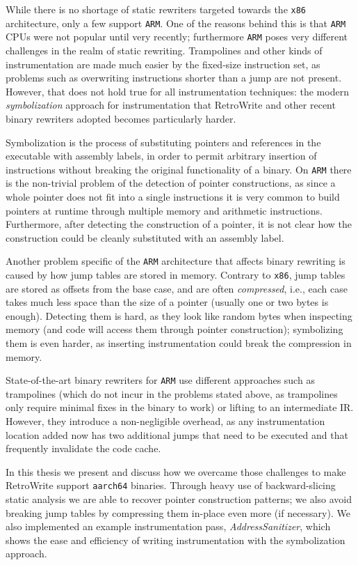 \documentclass[a4paper,11pt,oneside]{report}
\newcommand{\sysname}{RetroWrite\xspace}
\begin{document}
While there is no shortage of static rewriters targeted towards the
\texttt{x86} architecture, only a few support \texttt{ARM}. One of the reasons
behind this is that \texttt{ARM} CPUs were not popular until very recently;
furthermore \texttt{ARM} poses very different challenges in the realm of static
rewriting. Trampolines and other kinds of instrumentation are made much easier
by the fixed-size instruction set, as problems such as overwriting instructions
shorter than a jump are not present.  However, that does not hold true for all
instrumentation techniques: the modern \emph{symbolization} approach for
instrumentation that \sysname and other recent binary rewriters adopted becomes
particularly harder. 

Symbolization is the process of substituting pointers and references in the 
executable with assembly labels, in order to permit arbitrary insertion of 
instructions without breaking the original functionality of a binary. On 
\texttt{ARM} there is the non-trivial problem of the detection of pointer 
constructions, as since a whole pointer does not fit into a single instructions 
it is very common to build pointers at runtime through multiple memory and 
arithmetic instructions. Furthermore, after detecting the construction of a 
pointer, it is not clear how the construction could be cleanly substituted with 
an assembly label. 

Another problem specific of the \texttt{ARM} architecture that affects binary 
rewriting is caused by how jump tables are stored in memory. Contrary to 
\texttt{x86}, jump tables are stored as offsets from the base case, and are 
often \emph{compressed}, i.e., each case takes much less space than the size of 
a pointer (usually one or two bytes is enough). Detecting them is hard, as they 
look like random bytes when inspecting memory (and code will access them 
through pointer construction); symbolizing them is even harder, as inserting 
instrumentation could break the compression in memory.

State-of-the-art binary rewriters for \texttt{ARM} use different approaches 
such as trampolines (which do not incur in the problems stated above, as 
trampolines only require minimal fixes in the binary to work) or lifting to an 
intermediate IR.  However, they introduce a non-negligible overhead, as any 
instrumentation location added now has two additional jumps that need to be 
executed and that frequently invalidate the code cache. 

In this thesis we present and discuss how we overcame those challenges to make 
\sysname support \texttt{aarch64} binaries. Through heavy use of 
backward-slicing static analysis we are able to recover pointer construction 
patterns; we also avoid breaking jump tables by compressing them in-place even 
more (if necessary). We also implemented an example instrumentation pass, 
\emph{AddressSanitizer}, which shows the ease and efficiency of writing 
instrumentation with the symbolization approach. 
\end{document}
